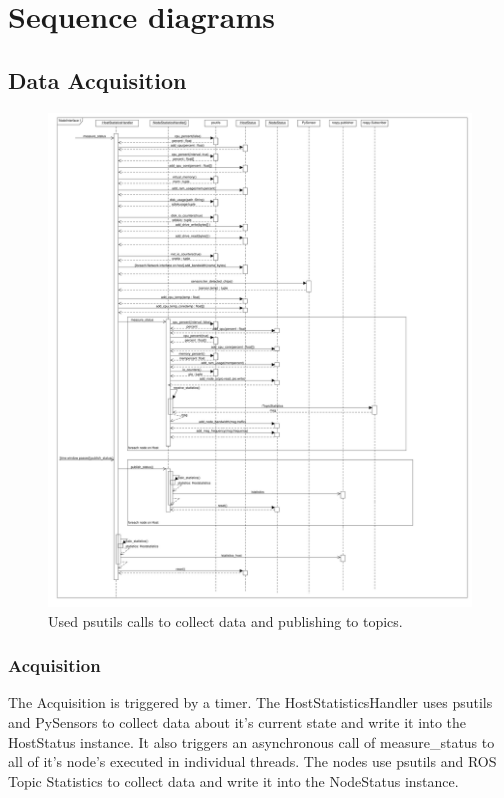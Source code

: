 \chapter{Sequence diagrams}

\section{Data Acquisition}
\begin{figure}[!ht]
	\begin{center}
		\includegraphics[width=0.8\linewidth]{./diagram_pictures/NodeInterface/erfassung_seq.pdf}
		\caption{Used psutils calls to collect data and publishing to topics.}
	\end{center}
\end{figure}

\subsection{Acquisition}
The Acquisition is triggered by a timer. The HostStatisticsHandler uses psutils and PySensors to collect data about it's current state and write it into the HostStatus instance. It also triggers an asynchronous call of measure\_status to all of it's node's executed in individual threads.
The nodes use psutils and ROS Topic Statistics to collect data and write it into the NodeStatus instance.

